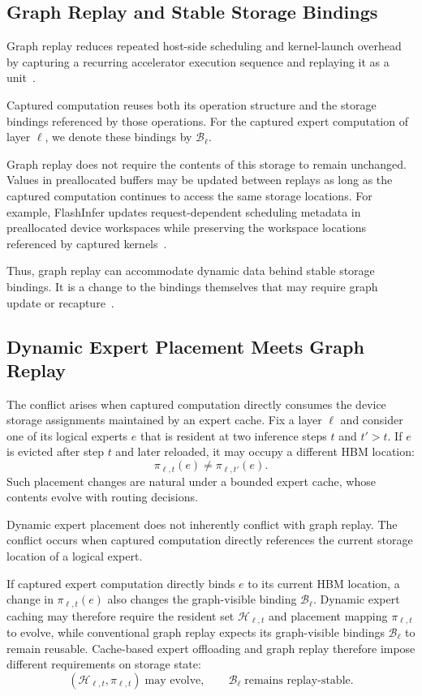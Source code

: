 \subsection{Graph Replay and Stable Storage Bindings}
\label{sec:background_graph}

Graph replay reduces repeated host-side scheduling and kernel-launch overhead by capturing a recurring accelerator execution sequence and replaying it as a unit~\cite{kwon2020nimble,ye2025flashinfer}.

Captured computation reuses both its operation structure and the storage bindings referenced by those operations.
For the captured expert computation of layer $\ell$, we denote these bindings by $\mathcal{B}_\ell$.

Graph replay does not require the contents of this storage to remain unchanged.
Values in preallocated buffers may be updated between replays as long as the captured computation continues to access the same storage locations.
For example, FlashInfer updates request-dependent scheduling metadata in preallocated device workspaces while preserving the workspace locations referenced by captured kernels~\cite{ye2025flashinfer}.

Thus, graph replay can accommodate dynamic data behind stable storage bindings.
It is a change to the bindings themselves that may require graph update or recapture~\cite{nvidiaCudaGraph}.

\subsection{Dynamic Expert Placement Meets Graph Replay}
\label{sec:background_conflict}

The conflict arises when captured computation directly consumes the device storage assignments maintained by an expert cache.
Fix a layer $\ell$ and consider one of its logical experts $e$ that is resident at two inference steps $t$ and $t' > t$.
If $e$ is evicted after step $t$ and later reloaded, it may occupy a different HBM location: 
\[ 
  \pi_{\ell,t}(e) \neq \pi_{\ell,t'}(e).
\] 
Such placement changes are natural under a bounded expert cache, whose contents evolve with routing decisions.

Dynamic expert placement does not inherently conflict with graph replay.
The conflict occurs when captured computation directly references the current storage location of a logical expert.

If captured expert computation directly binds $e$ to its current HBM location, a change in $\pi_{\ell,t}(e)$ also changes the graph-visible binding $\mathcal{B}_\ell$.
Dynamic expert caching may therefore require the resident set $\mathcal{H}_{\ell,t}$ and placement mapping $\pi_{\ell,t}$ to evolve, while conventional graph replay expects its graph-visible bindings $\mathcal{B}_\ell$ to remain reusable.
Cache-based expert offloading and graph replay therefore impose different requirements on storage state:
\[ 
 (\mathcal{H}_{\ell,t}, \pi_{\ell,t}) \;\text{may evolve},
 \qquad 
 \mathcal{B}_\ell \;\text{remains replay-stable}.
\]


